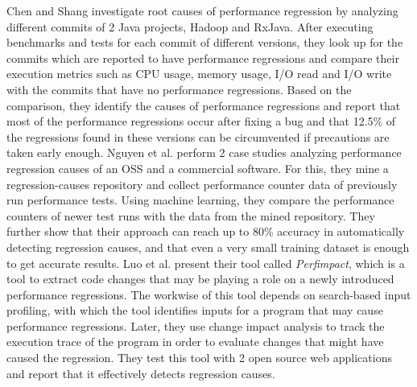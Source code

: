 \documentclass{seal_thesis}
\begin{document}
Chen and Shang \cite{chenshang} investigate root causes of performance regression by analyzing different commits of 2 Java projects, Hadoop and RxJava. After executing benchmarks and tests for each commit of different versions, they look up for the commits which are reported to have performance regressions and compare their execution metrics such as CPU usage, memory usage, I/O read and I/O write with the commits that have no performance regressions. Based on the comparison, they identify the causes of performance regressions and report that most of the performance regressions occur after fixing a bug and that 12.5\% of the regressions found in these versions can be circumvented if precautions are taken early enough. Nguyen et al. \cite{Nguyen:2014:ICS:2597073.2597092} perform 2 case studies analyzing performance regression causes of an OSS and a commercial software. For this, they mine a regression-causes repository and collect performance counter data of previously run performance tests. Using machine learning, they compare the performance counters of newer test runs with the data from the mined repository. They further show that their approach can reach up to 80\% accuracy in automatically detecting regression causes, and that even a very small training dataset is enough to get accurate results. Luo et al. \cite{Luo} present their tool called \textit{Perfimpact}, which is a tool to extract code changes that may be playing a role on a newly introduced performance regressions. The workwise of this tool depends on search-based input profiling, with which the tool identifies inputs for a program that may cause performance regressions. Later, they use change impact analysis to track the execution trace of the program in order to evaluate changes that might have caused the regression. They test this tool with 2 open source web applications and report that it effectively detects regression causes.\\
\\
\end{document}
